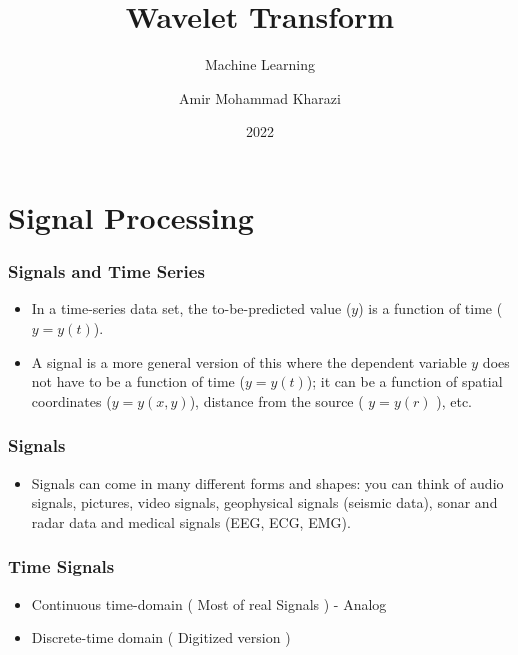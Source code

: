 \documentclass{beamer}
\title{Wavelet Transform}
\subtitle{Machine Learning}
\author{Amir Mohammad Kharazi}
\institute{Tarbiat Modares University\\\vspace{10mm}
\github
}
\date{2022}
\begin{document}
	
	
	
	\frame {
		\titlepage
	}
	
	\section{Signal Processing}
	\begin{frame}
		\frametitle{Signals and Time Series}
		
		\begin{itemize}
			\item
			In a time-series data set, the to-be-predicted value ($y$) is a function of time ($y = y(t)$).
			
			\item
			
			A signal is a more general version of this where the dependent variable $y$ does not have to be a function of time ($y = y(t)$);  it can be a function of spatial coordinates ($y = y(x, y)$), distance from the source ( $y = y(r)$ ), etc. 
			
		\end{itemize}	
	\end{frame}
	
	\begin{frame}
		\frametitle{Signals}
		\begin{itemize}
			\item
			
			 Signals can come in many different forms and shapes: you can think of audio signals, pictures, video signals, geophysical signals (seismic data), sonar and radar data and medical signals (EEG, ECG, EMG).
			
		\end{itemize}


		
		
	\end{frame}
	
	\begin{frame}
		\frametitle{Time Signals}
		
		\begin{itemize}
			\item 
			Continuous time-domain ( Most of real Signals ) - Analog
			\item
			Discrete-time domain ( Digitized version )
		\end{itemize}

	\end{frame}
	
\end{document}
